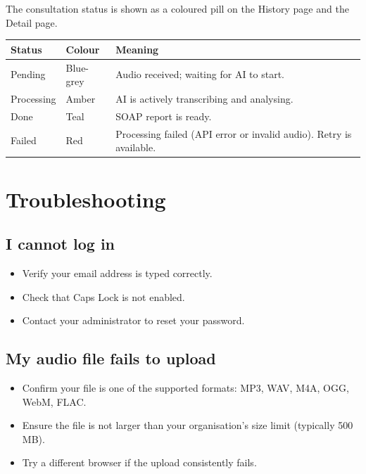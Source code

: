 \documentclass[12pt,a4paper]{article}
\begin{document}
The consultation status is shown as a coloured pill on the History page and the Detail page.

\begin{tabular}{m{3cm}m{3cm}m{6cm}}
	\textbf{Status} & \textbf{Colour} & \textbf{Meaning}                                                    \\
	\toprule
	Pending         & Blue-grey       & Audio received; waiting for AI to start.                            \\
	Processing      & Amber           & AI is actively transcribing and analysing.                          \\
	Done            & Teal            & SOAP report is ready.                                               \\
	Failed          & Red             & Processing failed (API error or invalid audio). Retry is available. \\
\end{tabular}

\section{Troubleshooting}

\subsection{I cannot log in}
\begin{itemize}
	\item Verify your email address is typed correctly.
	\item Check that Caps Lock is not enabled.
	\item Contact your administrator to reset your password.
\end{itemize}

\subsection{My audio file fails to upload}
\begin{itemize}
	\item Confirm your file is one of the supported formats: MP3, WAV, M4A, OGG, WebM, FLAC.
	\item Ensure the file is not larger than your organisation's size limit (typically 500 MB).
	\item Try a different browser if the upload consistently fails.
\end{itemize}
\end{document}
